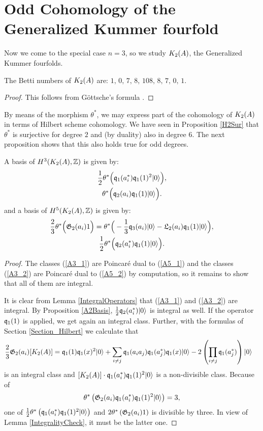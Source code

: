 \section{Odd Cohomology of the Generalized Kummer fourfold}
Now we come to the special case $n=3$, so we study $\kum{A}{2}$, the Generalized Kummer fourfolds.
\begin{proposition}
The Betti numbers of $\kum{A}{2}$ are:
$
1,\,0,\,7,\,8,\,108,\,8,\,7,\,0,\,1.
$
\end{proposition}
\begin{proof}
This follows from G\"ottsche's formula \cite[page 49]{Gottsche}.
\end{proof}

By means of the morphism $\theta^*$, we may express part of the cohomology of $\kum{A}{2}$ in terms of Hilbert scheme cohomology. We have seen in Proposition \ref{H2Sur} that $\theta^*$ is surjective for degree $2$ and (by duality) also in degree $6$. 
The next proposition shows that this also holds true for odd degrees.
\begin{proposition}\label{oddcohomology}
A basis of $H^3(\X,\Z)$ is given by:
\begin{gather}
\label{A3_1}
\frac{1}{2}\theta^*\Big( \q_1(a^*_i)\q_1(1)^2\vac \Big), \\
\label{A3_2}
\theta^*\Big(\q_2(a_i)\q_1(1)\vac\Big).
\end{gather}
and a basis of $H^5(\X,\Z)$ is given by:
\begin{gather}
\label{A5_1}
\frac{2}{3} \theta^*\Big( \G_2(a_i)1 \Big) = \theta^*\Big( -\frac{1}{3}\q_3(a_i)\vac -\mathfrak{L}_2(a_i)\q_1(1) \vac \Big), \\
\label{A5_2}
\frac{1}{2}\theta^*\Big( \q_2(a^*_i)\q_1(1)\vac \Big).
\end{gather}
\end{proposition}
\begin{proof}
The classes (\ref{A3_1}) are Poincar\'e dual to (\ref{A5_1}) and the classes (\ref{A3_2}) are Poincar\'e dual to (\ref{A5_2}) by computation, so it remains to show that all of them are integral.

It is clear from Lemma \ref{IntegralOperators} that (\ref{A3_1}) and (\ref{A3_2}) are integral. By Proposition \ref{A2Basis}, $\frac{1}{2}\q_2(a^*_i)\vac$ is integral as well. If the operator $ \q_1(1)$ is applied, we get again an integral class.
Further, with the formulas of Section \ref{Section_Hilbert} we calculate that 
\begin{align*}
\frac{2}{3} \G_2(a_i)[\kum{A}{2}] &= \q_1(1)\q_1(x)^2\vac + \sum_{i\neq j} \q_1(a_ia_j)\q_1(a_j^*)\q_1(x)\vac -2 \left( \prod_{\substack{i\neq j }} \q_1(a_j^*) \right)\vac
\end{align*}
is an integral class and $[\kum{A}{2}]\cdot\q_1(a^*_i)\q_1(1)^2\vac$ is a non-divisible class. 
Because of 
$$\theta^*\left( \G_2(a_i)  \q_1(a^*_i)\q_1(1)^2\vac\right) = 3,$$ 
one of $\frac{1}{2}\theta^*\left( \q_1(a^*_i)\q_1(1)^2\vac \right)$ and $ 2\theta^*\left( \G_2(a_i) 1\right)$ is divisible by three. In view of Lemma \ref{IntegralityCheck}, it must be the latter one.
\end{proof}
